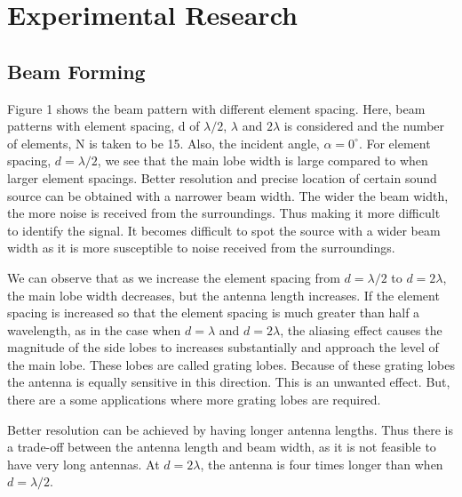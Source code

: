 \chapter*{Experimental Research}


\section{ Beam Forming } \label{ Beam Forming } 
\noindent Figure 1 shows the beam pattern with different element spacing. Here, beam patterns with element spacing, d of $\lambda/2$, $\lambda$ and $2\lambda$ is considered and the number of elements, N is taken to be 15. Also, the incident angle, $\alpha = 0^{\circ}$. For element spacing, $d = \lambda/2$, we see that the main lobe width is large compared to when larger element spacings. Better resolution and precise location of certain sound source can be obtained with a narrower beam width. The wider the beam width, the more noise is received from the surroundings. Thus making it more difficult to identify the signal. It becomes difficult to spot the source with a wider beam width as it is more susceptible to noise received from the surroundings.

\noindent We can observe that as we increase the element spacing from $d = \lambda/2$ to $d = 2\lambda$, the main lobe width decreases, but the antenna length increases. If the element spacing is increased so that the element spacing is much greater than half a wavelength, as in the case when $d = \lambda$ and $d = 2\lambda$, the aliasing effect causes the magnitude of the side lobes to increases substantially and approach the level of the main lobe. These lobes are called grating lobes. Because of these grating lobes the antenna is equally sensitive in this direction. This is an unwanted effect. But, there are a some applications where more grating lobes are required.

\noindent Better resolution can be achieved by having longer antenna lengths. Thus there is a trade-off between the antenna length and beam width, as it is not feasible to have very long antennas. At $d = 2\lambda$, the antenna is four times longer than when $d = \lambda/2$.

